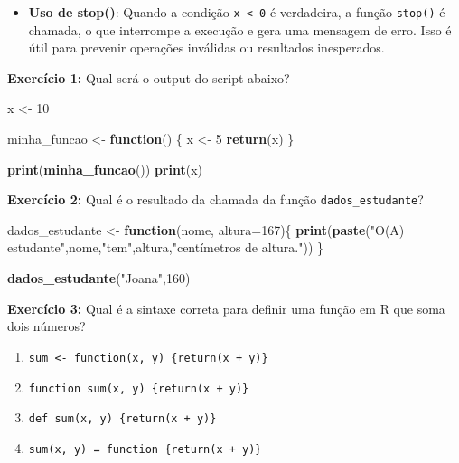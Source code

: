 \documentclass[
]{book}
\newenvironment{Shaded}{\begin{snugshade}}{\end{snugshade}}
\newcommand{\AttributeTok}[1]{\textcolor[rgb]{0.13,0.29,0.53}{#1}}
\newcommand{\ControlFlowTok}[1]{\textcolor[rgb]{0.13,0.29,0.53}{\textbf{#1}}}
\newcommand{\DecValTok}[1]{\textcolor[rgb]{0.00,0.00,0.81}{#1}}
\newcommand{\FunctionTok}[1]{\textcolor[rgb]{0.13,0.29,0.53}{\textbf{#1}}}
\newcommand{\NormalTok}[1]{#1}
\newcommand{\OtherTok}[1]{\textcolor[rgb]{0.56,0.35,0.01}{#1}}
\newcommand{\StringTok}[1]{\textcolor[rgb]{0.31,0.60,0.02}{#1}}
\providecommand{\tightlist}{%
  \setlength{\itemsep}{0pt}\setlength{\parskip}{0pt}}
\begin{document}
\begin{itemize}
\tightlist
\item
  \textbf{Uso de stop()}: Quando a condição \texttt{x\ \textless{}\ 0} é verdadeira, a função
  \texttt{stop()} é chamada, o que interrompe a execução e gera uma mensagem
  de erro. Isso é útil para prevenir operações inválidas ou resultados
  inesperados.
\end{itemize}

\textbf{Exercício 1:} Qual será o output do script abaixo?

\begin{Shaded}
\begin{Highlighting}[]
\NormalTok{x }\OtherTok{\textless{}{-}} \DecValTok{10}  

\NormalTok{minha\_funcao }\OtherTok{\textless{}{-}} \ControlFlowTok{function}\NormalTok{() \{}
\NormalTok{    x }\OtherTok{\textless{}{-}} \DecValTok{5}  
    \FunctionTok{return}\NormalTok{(x)}
\NormalTok{\}}

\FunctionTok{print}\NormalTok{(}\FunctionTok{minha\_funcao}\NormalTok{()) }
\FunctionTok{print}\NormalTok{(x) }
\end{Highlighting}
\end{Shaded}

\textbf{Exercício 2:} Qual é o resultado da chamada da função
\texttt{dados\_estudante}?

\begin{Shaded}
\begin{Highlighting}[]
\NormalTok{dados\_estudante }\OtherTok{\textless{}{-}} \ControlFlowTok{function}\NormalTok{(nome, }\AttributeTok{altura=}\DecValTok{167}\NormalTok{)\{}
  \FunctionTok{print}\NormalTok{(}\FunctionTok{paste}\NormalTok{(}\StringTok{"O(A) estudante"}\NormalTok{,nome,}\StringTok{"tem"}\NormalTok{,altura,}\StringTok{"centímetros de altura."}\NormalTok{))}
\NormalTok{\}}

\FunctionTok{dados\_estudante}\NormalTok{(}\StringTok{"Joana"}\NormalTok{,}\DecValTok{160}\NormalTok{)}
\end{Highlighting}
\end{Shaded}

\textbf{Exercício 3:} Qual é a sintaxe correta para definir uma função em R
que soma dois números?

\begin{enumerate}
\def\labelenumi{(\alph{enumi})}
\item
  \texttt{sum\ \textless{}-\ function(x,\ y)\ \{return(x\ +\ y)\}}
\item
  \texttt{function\ sum(x,\ y)\ \{return(x\ +\ y)\}}
\item
  \texttt{def\ sum(x,\ y)\ \{return(x\ +\ y)\}}
\item
  \texttt{sum(x,\ y)\ =\ function\ \{return(x\ +\ y)\}}
\end{enumerate}
\end{document}
